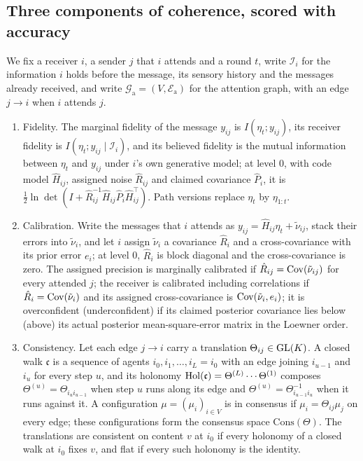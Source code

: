 \subsection{Three components of coherence, scored with accuracy}\label{sec:coh-components}

We fix a receiver $i$, a sender $j$ that $i$ attends and a round $t$, write $\mathcal I_i$ for the information $i$ holds before the message, its sensory history and the messages already received, and write $\mathcal G_{\mathrm a}=(V,\mathcal E_{\mathrm a})$ for the attention graph, with an edge $j\to i$ when $i$ attends $j$.

\begin{definition}\label{def:coh-components}
\begin{enumerate}\renewcommand{\labelenumi}{(\alph{enumi})}
\item Fidelity. The marginal fidelity of the message $y_{ij}$ is $I(\eta_t;y_{ij})$, its receiver fidelity is $I(\eta_t;y_{ij}\mid\mathcal I_i)$, and its believed fidelity is the mutual information between $\eta_t$ and $y_{ij}$ under $i$'s own generative model; at level 0, with code model $\hat H_{ij}$, assigned noise $\hat R_{ij}$ and claimed covariance $\hat P_i$, it is $\frac12\ln\det(I+\hat R_{ij}^{-1}\hat H_{ij}\hat P_i\hat H_{ij}^\top)$. Path versions replace $\eta_t$ by $\eta_{1:t}$.
\item Calibration. Write the messages that $i$ attends as $y_{ij}=\hat H_{ij}\eta_t+\tilde\nu_{ij}$, stack their errors into $\tilde\nu_i$, and let $i$ assign $\tilde\nu_i$ a covariance $\hat R_i$ and a cross-covariance with its prior error $e_i$; at level 0, $\hat R_i$ is block diagonal and the cross-covariance is zero. The assigned precision is marginally calibrated if $\hat R_{ij}=\operatorname{Cov}(\tilde\nu_{ij})$ for every attended $j$; the receiver is calibrated including correlations if $\hat R_i=\operatorname{Cov}(\tilde\nu_i)$ and its assigned cross-covariance is $\operatorname{Cov}(\tilde\nu_i,e_i)$; it is overconfident (underconfident) if its claimed posterior covariance lies below (above) its actual posterior mean-square-error matrix in the Loewner order.
\item Consistency. Let each edge $j\to i$ carry a translation $\Theta_{ij}\in\mathrm{GL}(K)$. A closed walk $\mathfrak c$ is a sequence of agents $i_0,i_1,\dots,i_L=i_0$ with an edge joining $i_{u-1}$ and $i_u$ for every step $u$, and its holonomy $\operatorname{Hol}(\mathfrak c)=\Theta^{(L)}\cdots\Theta^{(1)}$ composes $\Theta^{(u)}=\Theta_{i_ui_{u-1}}$ when step $u$ runs along its edge and $\Theta^{(u)}=\Theta_{i_{u-1}i_u}^{-1}$ when it runs against it. A configuration $\mu=(\mu_i)_{i\in V}$ is in consensus if $\mu_i=\Theta_{ij}\mu_j$ on every edge; these configurations form the consensus space $\mathrm{Cons}(\Theta)$. The translations are consistent on content $v$ at $i_0$ if every holonomy of a closed walk at $i_0$ fixes $v$, and flat if every such holonomy is the identity.

\end{enumerate}
\end{definition}
